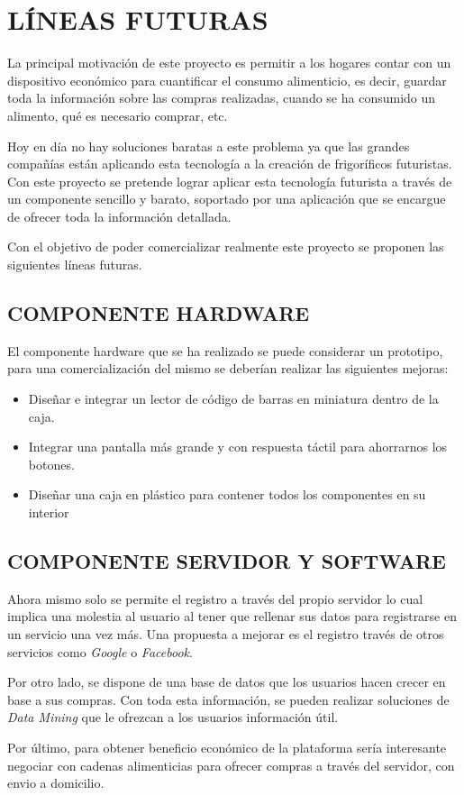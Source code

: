 \chapter{LÍNEAS FUTURAS}

La principal motivación de este proyecto es permitir a los hogares contar con un dispositivo económico para cuantificar el consumo alimenticio, es decir, guardar toda la información sobre las compras realizadas, cuando se ha consumido un alimento, qué es necesario comprar, etc.

Hoy en día no hay soluciones baratas a este problema ya que las grandes compañías están aplicando esta tecnología a la creación de frigoríficos futuristas. Con este proyecto se pretende lograr aplicar esta tecnología futurista a través de un componente sencillo y barato, soportado por una aplicación que se encargue de ofrecer toda la información detallada.

Con el objetivo de poder comercializar realmente este proyecto se proponen las siguientes líneas futuras.

\section{COMPONENTE HARDWARE}

El componente hardware que se ha realizado se puede considerar un prototipo, para una comercialización del mismo se deberían realizar las siguientes mejoras:

\begin{itemize}
    \item Diseñar e integrar un lector de código de barras en miniatura dentro de la caja.
    \item Integrar una pantalla más grande y con respuesta táctil para ahorrarnos los botones.
    \item Diseñar una caja en plástico para contener todos los componentes en su interior
\end{itemize}

\section{COMPONENTE SERVIDOR Y SOFTWARE}

Ahora mismo solo se permite el registro a través del propio servidor lo cual implica una molestia al usuario al tener que rellenar sus datos para registrarse en un servicio una vez más. Una propuesta a mejorar es el registro través de otros servicios como \emph{Google} o \emph{Facebook}.

Por otro lado, se dispone de una base de datos que los usuarios hacen crecer en base a sus compras. Con toda esta información, se pueden realizar soluciones de \emph{Data Mining} que le ofrezcan a los usuarios información útil.

Por último, para obtener beneficio económico de la plataforma sería interesante negociar con cadenas alimenticias para ofrecer compras a través del servidor, con envio a domicilio.